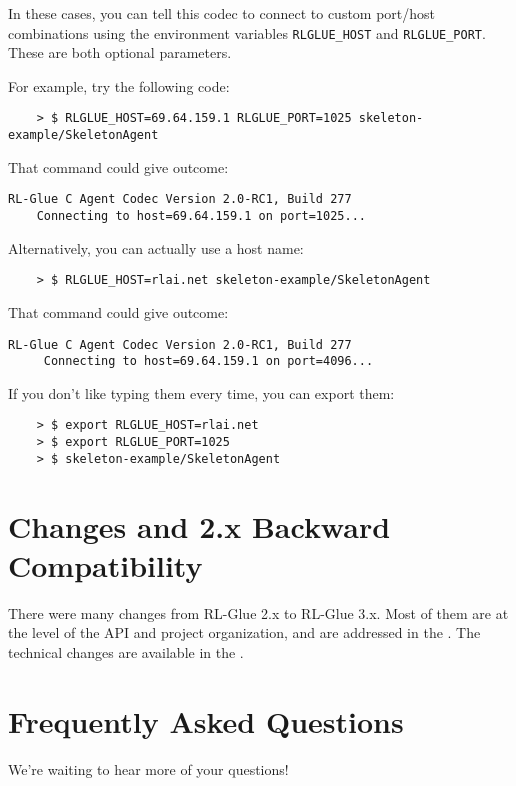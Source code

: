 \documentclass[11pt]{article}
\begin{document}
In these cases, you can tell this codec to connect to custom port/host combinations using the environment
variables \texttt{RLGLUE\_HOST} and \texttt{RLGLUE\_PORT}.  These are both optional parameters.

For example, try the following code:
\begin{verbatim}
	> $ RLGLUE_HOST=69.64.159.1 RLGLUE_PORT=1025 skeleton-example/SkeletonAgent 
\end{verbatim}

That command could give outcome:
\begin{verbatim}
RL-Glue C Agent Codec Version 2.0-RC1, Build 277
    Connecting to host=69.64.159.1 on port=1025...
\end{verbatim}

Alternatively, you can actually use a host name:
\begin{verbatim}
	> $ RLGLUE_HOST=rlai.net skeleton-example/SkeletonAgent 
\end{verbatim}

That command could give outcome:
\begin{verbatim}
RL-Glue C Agent Codec Version 2.0-RC1, Build 277
     Connecting to host=69.64.159.1 on port=4096...
\end{verbatim}

If you don't like typing them every time, you can export them:
\begin{verbatim}
	> $ export RLGLUE_HOST=rlai.net
	> $ export RLGLUE_PORT=1025
	> $ skeleton-example/SkeletonAgent 
\end{verbatim}




\section{Changes and 2.x Backward Compatibility}
There were many changes from RL-Glue 2.x to RL-Glue 3.x.  Most of them are at the level of the API and project organization, and are addressed in the .  The technical changes are available in the .



\section{Frequently Asked Questions}
We're waiting to hear more of your questions!
\end{document}
